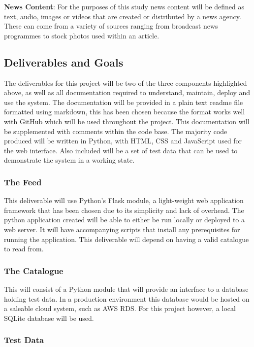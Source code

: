 \documentclass[12pt,titlepage]{article}
\begin{document}
  \textbf{News Content}: For the purposes of this study news content will be
  defined as text, audio, images or videos that are created or distributed by a
  news agency. These can come from a variety of sources ranging from broadcast
  news programmes to stock photos used within an article.

  \subsection{Deliverables and Goals}

  The deliverables for this project will be two of the three components
  highlighted above, as well as all documentation required to understand,
  maintain, deploy and use the system. The documentation will be provided in a
  plain text readme file formatted using markdown, this has been chosen because
  the format works well with GitHub which will be used throughout the project.
  This documentation will be supplemented with comments within the code base. The
  majority code produced will be written in Python, with HTML, CSS and
  JavaScript used for the web interface. Also included will be a set of test
  data that can be used to demonstrate the system in a working state.

    \subsubsection{The Feed}

    This deliverable will use Python's Flask module, a light-weight web
    application framework that has been chosen due to its simplicity and lack of
    overhead. The python application created will be able to either be run
    locally or deployed to a web server. It will have accompanying scripts that
    install any prerequisites for running the application. This deliverable will
    depend on having a valid catalogue to read from.

    \subsubsection{The Catalogue}

    This will consist of a Python module that will provide an interface to a
    database holding test data. In a production environment this database would
    be hosted on a saleable cloud system, such as AWS RDS. For this project
    however, a local SQLite database will be used.

    \subsubsection{Test Data}
\end{document}
